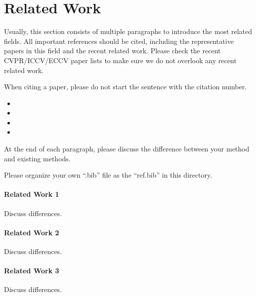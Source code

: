 \section{Related Work}
\label{sec:related_works}
Usually, this section consists of multiple paragraphs to introduce the most related fields. All important references should be cited, including the representative papers in this field and the recent related work. Please check the recent CVPR/ICCV/ECCV paper lists to make sure we do not overlook any recent related work.

When citing a paper, please do not start the sentence with the citation number.
\begin{itemize}[itemsep=0pt,parsep=0pt,topsep=2bp]
    \item {}
    \item {}
    \item {}
    \item {}
\end{itemize}

At the end of each paragraph, please discuss the difference between your method and existing methods.

Please organize your own ``.bib'' file as the ``ref.bib'' in this directory.

\paragraph{Related Work 1} 
\textcolor{\dummycolor}{\lipsum[1]} Discuss differences.

\paragraph{Related Work 2} 
\textcolor{\dummycolor}{\lipsum[2]} 
\textcolor{\dummycolor}{\lipsum[2]} 
Discuss differences.

\paragraph{Related Work 3} 
\textcolor{\dummycolor}{\lipsum[1]} Discuss differences.

